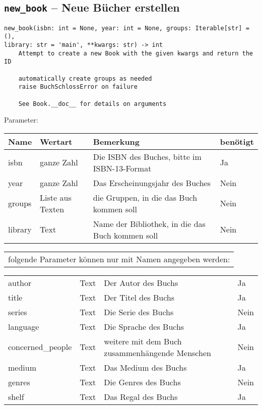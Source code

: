 \subsection{\texttt{new\_book} -- Neue Bücher erstellen}
\label{subsec:command_list:new_book}

\begin{verbatim}
new_book(isbn: int = None, year: int = None, groups: Iterable[str] = (),
library: str = 'main', **kwargs: str) -> int
    Attempt to create a new Book with the given kwargs and return the ID

    automatically create groups as needed
    raise BuchSchlossError on failure

    See Book.__doc__ for details on arguments
\end{verbatim}

Parameter:

\begin{tabular}{|p{}|p{}|p{}|p{}}
Name & Wertart & Bemerkung & benötigt\\
\hline
isbn & ganze Zahl & Die ISBN des Buches, bitte im ISBN-13-Format & Ja\\
year & ganze Zahl & Das Erscheinungsjahr des Buches & Nein \\
groups & Liste aus Texten & die Gruppen, in die das Buch kommen soll & Nein\\
library & Text & Name der Bibliothek, in die das Buch kommen soll & Nein \\
\hline
\end{tabular}

\begin{tabular}{|c|}folgende Parameter können nur mit Namen angegeben werden: \end{tabular}

\begin{tabular}{|p{}|p{}|p{}|p{}}
\hline
author & Text & Der Autor des Buchs & Ja \\
title & Text & Der Titel des Buchs & Ja \\
series & Text & Die Serie des Buchs & Nein \\
language & Text & Die Sprache des Buchs & Ja \\
concerned\_\-people & Text & weitere mit dem Buch zusammenhängende Menschen & Nein \\
medium & Text & Das Medium des Buchs & Ja \\
genres & Text & Die Genres des Buchs & Nein \\
shelf & Text & Das Regal des Buchs & Ja \\
\end{tabular}

